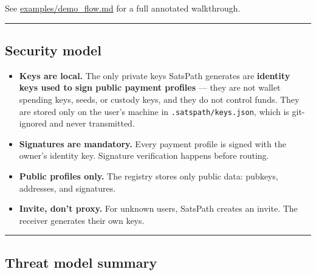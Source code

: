\documentclass[
]{article}
\providecommand{\tightlist}{%
  \setlength{\itemsep}{0pt}\setlength{\parskip}{0pt}}
\begin{document}
See \url{examples/demo_flow.md} for a full annotated walkthrough.

\begin{center}\rule{0.5\linewidth}{0.5pt}\end{center}

\hypertarget{security-model}{%
\subsection{Security model}\label{security-model}}

\begin{itemize}
\tightlist
\item
  \textbf{Keys are local.} The only private keys SatsPath generates are
  \textbf{identity keys used to sign public payment profiles} --- they
  are not wallet spending keys, seeds, or custody keys, and they do not
  control funds. They are stored only on the user's machine in
  \texttt{.satspath/keys.json}, which is git-ignored and never
  transmitted.
\item
  \textbf{Signatures are mandatory.} Every payment profile is signed
  with the owner's identity key. Signature verification happens before
  routing.
\item
  \textbf{Public profiles only.} The registry stores only public data:
  pubkeys, addresses, and signatures.
\item
  \textbf{Invite, don't proxy.} For unknown users, SatsPath creates an
  invite. The receiver generates their own keys.
\end{itemize}

\begin{center}\rule{0.5\linewidth}{0.5pt}\end{center}

\hypertarget{threat-model-summary}{%
\subsection{Threat model summary}\label{threat-model-summary}}
\end{document}
